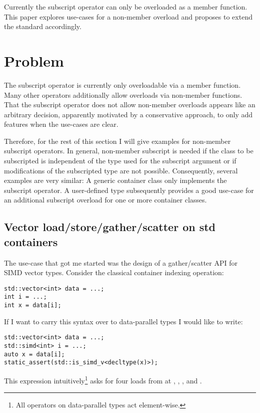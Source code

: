 \newcommand\wgTitle{Non-Member Subscript Operator}
\newcommand\wgName{Matthias Kretz <m.kretz@gsi.de>}
\newcommand\wgDocumentNumber{DNMSOR0}
\newcommand\wgGroup{EWG-I}
\newcommand\wgTarget{\CC{}23}

\usepackage{mymacros}
\usepackage{wg21}


\newlength\myIndent

\begin{wgTitlepage}
  Currently the subscript operator can only be overloaded as a member function.
  This paper explores use-cases for a non-member overload and proposes to extend
  the standard accordingly.
\end{wgTitlepage}

\section{Problem}
The subscript operator is currently only overloadable via a member function.
Many other operators additionally allow overloads via non\hyp member functions.
That the subscript operator does not allow non\hyp member overloads appears like an arbitrary decision, apparently motivated by a conservative approach, to only add features when the use\hyp cases are clear.

Therefore, for the rest of this section I will give examples for non\hyp member subscript operators.
In general, non\hyp member subscript is needed if the class to be subscripted is independent of the type used for the subscript argument or if modifications of the subscripted type are not possible.
Consequently, several examples are very similar:
A generic container class only implements the  subscript operator.
A user-defined type subsequently provides a good use\hyp case for an additional subscript overload for one or more container classes.

\subsection{Vector load/store/gather/scatter on std containers}
The use\hyp case that got me started was the design of a gather/scatter API for SIMD vector types.
Consider the classical container indexing operation:
\smallskip\begin{lstlisting}
std::vector<int> data = ...;
int i = ...;
int x = data[i];
\end{lstlisting}
If I want to carry this syntax over to data\hyp parallel types I would like to write:
\smallskip\begin{lstlisting}
std::vector<int> data = ...;
std::simd<int> i = ...;
auto x = data[i];
static_assert(std::is_simd_v<decltype(x)>);
\end{lstlisting}
This expression intuitively\footnote{All operators on data-parallel types act element-wise.} asks for four loads from  at , , , and .


